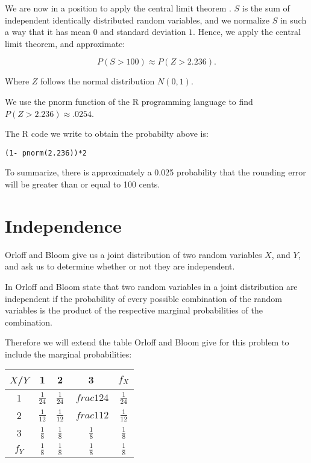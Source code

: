 \documentclass[a5paper,11pt]{article}
\begin{document}
We are now in a position to apply the
central limit theorem \cite{reading6b}. 
$S$ is the sum of
independent identically distributed
random variables, and we normalize $S$ in 
such a way that it has mean $0$ and
standard deviation $1$. Hence, we apply
the central limit theorem, and approximate:

\begin{equation}
P\left(S > 100 \right) \approx
P \left(Z > 2.236 \right).
\end{equation}

Where $Z$ follows the normal distribution
$N\left(0,1 \right)$.

We use the pnorm function of the R 
programming language to find 
$P \left(Z > 2.236 \right) 
\approx .0254$.

The R code we write to obtain the 
probabilty above is:
\begin{lstlisting}
(1- pnorm(2.236))*2
\end{lstlisting}

To summarize, there is approximately
a 0.025 probability that the rounding
error will be greater than or equal to
100 cents.

\section{Independence}
Orloff and Bloom give us a joint distribution of two random  variables
$X$, and $Y$, and ask us to determine whether or not they are independent.

In \cite{reading7a} Orloff and Bloom state 
that two random variables in a joint
distribution are independent if the
probability of every possible combination
of the random variables is the product
of the respective marginal probabilities of
the combination.

Therefore we will extend the table Orloff
and Bloom give for this problem to
include the marginal probabilities:


\begin{center}
\begin{tabular}{ | c | c | c | c  | c | }
    \hline
    $X$/$Y$ & 1 & 2 & 3 & $f_X$ \\ \hline
    1 & $\frac{1}{24}$ & $\frac{1}{24}$ & $\
frac{1}{24}$ & $\frac{1}{24}$ \\ \hline
    2 & $\frac{1}{12}$ & $\frac{1}{12}$ & $\
frac{1}{12}$ & $\frac{1}{12}$ \\ \hline
    3 & $\frac{1}{8}$ & $\frac{1}{8}$ & $\frac{1}{8}$ & $\frac{1}{8}$ \\ \hline
    $f_Y$ & $\frac{1}{8}$ & $\frac{1}{8}$ & $\frac{1}{8}$ & $\frac{1}{8}$ \\ \hline
  \end{tabular}
\end{center}

\printbibliography{}
\end{document}
